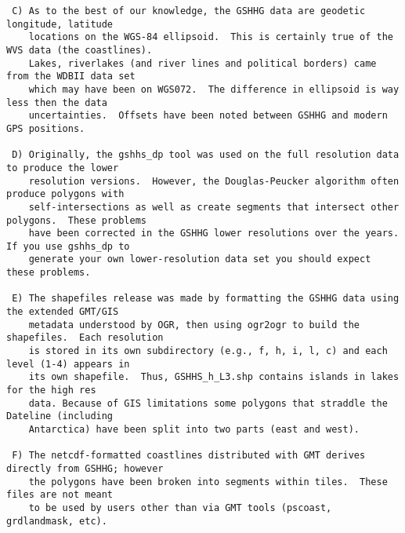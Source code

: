 {\begin{verbatim}
 C) As to the best of our knowledge, the GSHHG data are geodetic longitude, latitude
    locations on the WGS-84 ellipsoid.  This is certainly true of the WVS data (the coastlines).
    Lakes, riverlakes (and river lines and political borders) came from the WDBII data set
    which may have been on WGS072.  The difference in ellipsoid is way less then the data
    uncertainties.  Offsets have been noted between GSHHG and modern GPS positions.

 D) Originally, the gshhs_dp tool was used on the full resolution data to produce the lower
    resolution versions.  However, the Douglas-Peucker algorithm often produce polygons with
    self-intersections as well as create segments that intersect other polygons.  These problems
    have been corrected in the GSHHG lower resolutions over the years.  If you use gshhs_dp to
    generate your own lower-resolution data set you should expect these problems.

 E) The shapefiles release was made by formatting the GSHHG data using the extended GMT/GIS
    metadata understood by OGR, then using ogr2ogr to build the shapefiles.  Each resolution
    is stored in its own subdirectory (e.g., f, h, i, l, c) and each level (1-4) appears in
    its own shapefile.  Thus, GSHHS_h_L3.shp contains islands in lakes for the high res
    data. Because of GIS limitations some polygons that straddle the Dateline (including
    Antarctica) have been split into two parts (east and west).

 F) The netcdf-formatted coastlines distributed with GMT derives directly from GSHHG; however
    the polygons have been broken into segments within tiles.  These files are not meant
    to be used by users other than via GMT tools (pscoast, grdlandmask, etc).
\end{verbatim}
}
